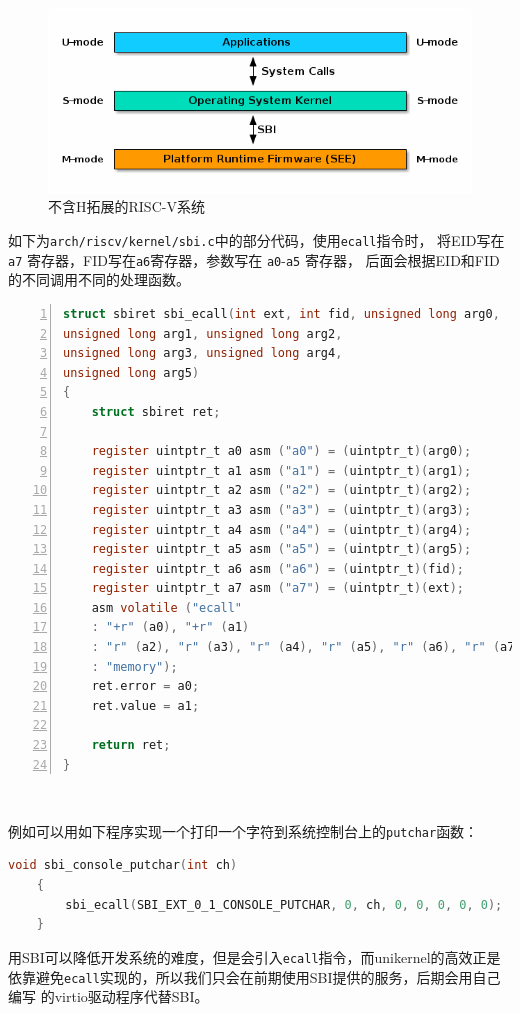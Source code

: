 \documentclass{../runikraft-report}
\begin{document}
\begin{figure}[tbh!]
\centering
\includegraphics[width=0.7\linewidth]{../assets/riscv-sbi-intro1.png}
\caption{不含H拓展的RISC-V系统}
\label{fig:riscv-sbi}
\end{figure}

如下为\texttt{arch/riscv/kernel/sbi.c}中的部分代码，使用\texttt{ecall}指令时，
将EID写在\texttt{a7} 寄存器，FID写在\texttt{a6}寄存器，参数写在 \texttt{a0}-\texttt{a5} 寄存器，
后面会根据EID和FID的不同调用不同的处理函数。
\begin{lstlisting}[language=C,numbers=left]
struct sbiret sbi_ecall(int ext, int fid, unsigned long arg0,
unsigned long arg1, unsigned long arg2,
unsigned long arg3, unsigned long arg4,
unsigned long arg5)
{
	struct sbiret ret;

	register uintptr_t a0 asm ("a0") = (uintptr_t)(arg0);
	register uintptr_t a1 asm ("a1") = (uintptr_t)(arg1);
	register uintptr_t a2 asm ("a2") = (uintptr_t)(arg2);
	register uintptr_t a3 asm ("a3") = (uintptr_t)(arg3);
	register uintptr_t a4 asm ("a4") = (uintptr_t)(arg4);
	register uintptr_t a5 asm ("a5") = (uintptr_t)(arg5);
	register uintptr_t a6 asm ("a6") = (uintptr_t)(fid);
	register uintptr_t a7 asm ("a7") = (uintptr_t)(ext);
	asm volatile ("ecall"
	: "+r" (a0), "+r" (a1)
	: "r" (a2), "r" (a3), "r" (a4), "r" (a5), "r" (a6), "r" (a7)
	: "memory");
	ret.error = a0;
	ret.value = a1;

	return ret;
}
\end{lstlisting}​

例如可以用如下程序实现一个打印一个字符到系统控制台上的\texttt{putchar}函数：
\begin{lstlisting}[language=C]
    void sbi_console_putchar(int ch)
    {
    	sbi_ecall(SBI_EXT_0_1_CONSOLE_PUTCHAR, 0, ch, 0, 0, 0, 0, 0);
    }
\end{lstlisting}

用SBI可以降低开发系统的难度，但是会引入\texttt{ecall}指令，而unikernel的高效正是
依靠避免\texttt{ecall}实现的，所以我们只会在前期使用SBI提供的服务，后期会用自己编写
的virtio驱动程序代替SBI。
\end{document}
